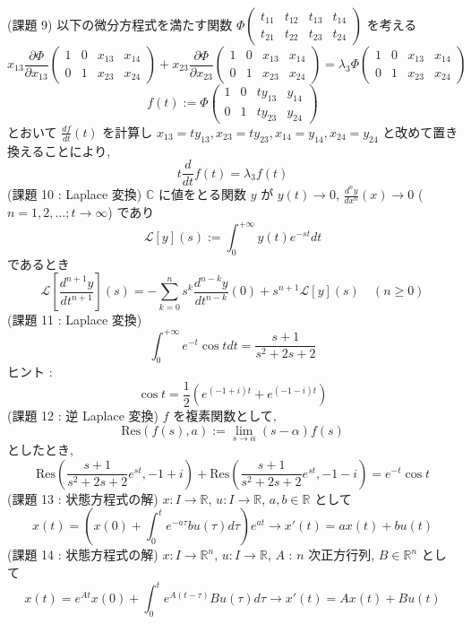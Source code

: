 \documentclass{article}
\begin{document}
(課題 9) 以下の微分方程式を満たす関数 $\Phi\begin{pmatrix}
t_{11} & t_{12} & t_{13} & t_{14} \\
t_{21} & t_{22} & t_{23} & t_{24}
\end{pmatrix}$ を考える
\[ x_{13} \frac{\partial \Phi}{\partial x_{13}} \begin{pmatrix}
  1 & 0 & x_{13} & x_{14} \\
  0 & 1 & x_{23} & x_{24}
\end{pmatrix} + x_{23} \frac{\partial \Phi}{\partial x_{23}} \begin{pmatrix}
  1 & 0 & x_{13} & x_{14} \\
  0 & 1 & x_{23} & x_{24}
\end{pmatrix}= \lambda_3 \Phi \begin{pmatrix}
  1 & 0 & x_{13} & x_{14} \\
  0 & 1 & x_{23} & x_{24}
\end{pmatrix}\]
\[ f(t) := \Phi
\begin{pmatrix}
  1 & 0 & t y_{13} & y_{14} \\
  0 & 1 & t y_{23} & y_{24}
\end{pmatrix} \]
とおいて $\frac{df}{dt}(t)$ を計算し $x_{13} = t y_{13}, x_{23} = t y_{23}, x_{14} = y_{14}, x_{24} = y_{24}$ と改めて置き換えることにより, 
\[ t \frac{d}{dt} f(t) = \lambda_3 f(t) \]
(課題 10 : Laplace 変換) $\mathbb{C}$ に値をとる関数 $y$ が $y(t) \to 0$, $\frac{d^n y}{dx^n} (x) \to 0$ ($n = 1,2, ...; t \to \infty$) であり
\[ \mathcal{L}[y](s) := \int^{+\infty}_{0} y(t) e^{-st} dt \]
であるとき
\[ \mathcal{L}[\frac{d^{n+1}y}{dt^{n+1}}](s) = - \sum^{n}_{k=0} s^{k} \frac{d^{n-k}y}{dt^{n-k}}(0) + s^{n+1} \mathcal{L}[y](s) \quad (n \geq 0) \]
(課題 11 : Laplace 変換) 
\[ \int^{+\infty}_{0} e^{-t}\cos{t} dt = \frac{s+1}{s^2+2s+2} \]
ヒント :
\[ \cos{t} = \frac{1}{2} (e^{(-1+i)t} + e^{(-1-i)t}) \]
(課題 12 : 逆 Laplace 変換) $f$ を複素関数として,
\[\text{Res} (f(s), a) := \lim_{s \to \alpha} (s-\alpha)f(s)\]
としたとき,
\[ \text{Res} \left( \frac{s+1}{s^2+2s+2}e^{st}, -1+i \right) + \text{Res} \left( \frac{s+1}{s^2+2s+2}e^{st}, -1-i \right) = e^{-t}\cos{t} \]
\newpage \noindent
(課題 13 : 状態方程式の解) $x : I \to \mathbb{R}$, $u : I \to \mathbb{R}$, $a, b \in \mathbb{R}$ として
\[ x(t) = \left( x(0) + \int^{t}_{0} e^{-a \tau} bu(\tau)d\tau \right) e^{at} \rightarrow x'(t) = ax(t) + bu(t) \]
(課題 14 : 状態方程式の解) $x : I \to \mathbb{R}^n$, $u : I \to \mathbb{R}$, $A$ : $n$ 次正方行列, $B \in \mathbb{R}^n$ として
\[ x(t) = e^{At} x(0) + \int^{t}_{0} e^{A(t-\tau)} Bu(\tau)d\tau \rightarrow x'(t) = Ax(t) + Bu(t) \]
\end{document}
